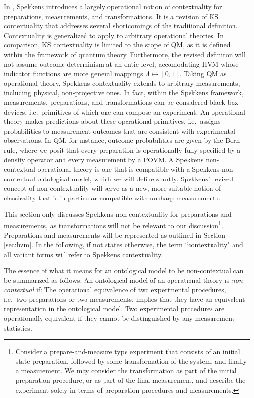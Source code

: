 In \cite{Spekkens2005}, Spekkens introduces a largely operational notion of contextuality for preparations, measurements, and transformations. It is a revision of KS contextuality that addresses several shortcomings of the traditional definition. Contextuality is generalized to apply to arbitrary operational theories. In comparison, KS contextuality is limited to the scope of QM, as it is defined within the framework of quantum theory. Furthermore, the revised definiton will not assume outcome determinism at an ontic level, accomodating HVM whose indicator functions are more general mappings $\Lambda\mapsto [0,1]$. Taking QM as operational theory, Spekkens contextuality extends to arbitrary measurements, including physical, non-projective ones. In fact, within the Spekkens framework, measurements, preparations, and transformations can be considered black box devices, i.e.\ primitives of which one can compose an experiment. An operational theory makes predictions about these operational primitives, i.e.\ assigns probabilities to measurement outcomes that are consistent with experimental observations. In QM, for instance, outcome probabilities are given by the Born rule, where we posit that every preparation is operationally fully specified by a density operator and every measurement by a POVM. A Spekkens non-contextual operational theory is one that is compatible with a Spekkens non-contextual ontological model, which we will define shortly. Spekkens' revised concept of non-contextuality will serve as a new, more suitable notion of classicality that is in particular compatible with unsharp measurements.

This section only discusses Spekkens non-contextuality for preparations and measurements, as transformations will not be relevant to our discussion\footnote{Consider a prepare-and-measure type experiment that consists of an initial state preparation, followed by some transformation of the system, and finally a measurement. We may consider the transformation as part of the initial preparation procedure, or as part of the final measurement, and describe the experiment solely in terms of preparation procedures and measurements.}. Preparations and measurements will be represented as outlined in Section \ref{sec:hvm}. In the following, if not states otherwise, the term ``contextuality" and all variant forms will refer to Spekkens contextuality.

The essence of what it means for an ontological model to be non-contextual can be summarized as follows:
An ontological model of an operational theory is \emph{non-contextual} if:
The operational equivalence of two experimental procedures, i.e.\ two preparations or two measurements, 
implies that they have an equivalent representation in the ontological model.
Two experimental procedures are operationally equivalent if they cannot be distinguished by any measurement statistics. 

